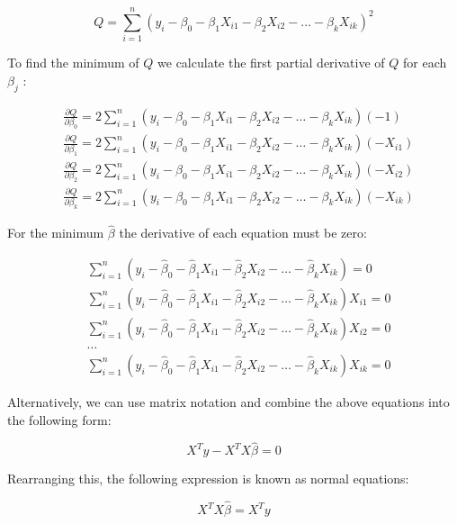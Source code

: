 \documentclass[
  12 pt,
  a4paper,
]{book}
\numberwithin{equation}{section}
\theoremstyle{plain}      %
\theoremstyle{definition} %
\theoremstyle{remark}     %
\theoremstyle{note}         %
\begin{document}
\[
Q=\sum_{i=1}^{n}\left(y_{i}-\beta_{0}-\beta_{1} X_{i 1}-\beta_{2} X_{i 2}-\ldots-\beta_{k} X_{i k}\right)^{2}
\]

To find the minimum of \(Q\) we calculate the first partial derivative
of \(Q\) for each \(\beta_{j}\) :

\[
\begin{aligned}
&\frac{\partial Q}{\partial \beta_{0}}=2 \sum_{i=1}^{n}\left(y_{i}-\beta_{0}-\beta_{1} X_{i 1}-\beta_{2} X_{i 2}-\ldots-\beta_{k} X_{i k}\right)(-1) \\
&\frac{\partial Q}{\partial \beta_{1}}=2 \sum_{i=1}^{n}\left(y_{i}-\beta_{0}-\beta_{1} X_{i 1}-\beta_{2} X_{i 2}-\ldots-\beta_{k} X_{i k}\right)\left(-X_{i 1}\right) \\
&\frac{\partial Q}{\partial \beta_{2}}=2 \sum_{i=1}^{n}\left(y_{i}-\beta_{0}-\beta_{1} X_{i 1}-\beta_{2} X_{i 2}-\ldots-\beta_{k} X_{i k}\right)\left(-X_{i 2}\right) \\
&\frac{\partial Q}{\partial \beta_{k}}=2 \sum_{i=1}^{n}\left(y_{i}-\beta_{0}-\beta_{1} X_{i 1}-\beta_{2} X_{i 2}-\ldots-\beta_{k} X_{i k}\right)\left(-X_{i k}\right)
\end{aligned}
\]

For the minimum \(\hat{\beta}\) the derivative of each equation must be
zero:

\[
\begin{aligned}
&\sum_{i=1}^{n}\left(y_{i}-\hat{\beta}_{0}-\hat{\beta}_{1} X_{i 1}-\hat{\beta}_{2} X_{i 2}-\ldots-\hat{\beta}_{k} X_{i k}\right)=0 \\
&\sum_{i=1}^{n}\left(y_{i}-\hat{\beta}_{0}-\hat{\beta}_{1} X_{i 1}-\hat{\beta}_{2} X_{i 2}-\ldots-\hat{\beta}_{k} X_{i k}\right) X_{i 1}=0 \\
&\sum_{i=1}^{n}\left(y_{i}-\hat{\beta}_{0}-\hat{\beta}_{1} X_{i 1}-\hat{\beta}_{2} X_{i 2}-\ldots-\hat{\beta}_{k} X_{i k}\right) X_{i 2}=0 \\
&\ldots \\
&\sum_{i=1}^{n}\left(y_{i}-\hat{\beta}_{0}-\hat{\beta}_{1} X_{i 1}-\hat{\beta}_{2} X_{i 2}-\ldots-\hat{\beta}_{k} X_{i k}\right) X_{i k}=0
\end{aligned}
\]

Alternatively, we can use matrix notation and combine the above
equations into the following form:

\[
X^{T} y-X^{T} X \hat{\beta}=0
\]

Rearranging this, the following expression is known as normal equations:

\[
X^{T} X \hat{\beta}=X^{T} y
\]
\end{document}
